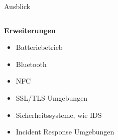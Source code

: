 {\begin{frame}{Ausblick}
\begin{columns}
   \begin{column}{0.5\textwidth}
        \textbf{Erweiterungen}
        \begin{itemize}
            \item Batteriebetrieb
            \item Bluetooth
            \item NFC
            \item SSL/TLS Umgebungen
            \item Sicherheitssysteme, wie IDS
            \item Incident Response Umgebungen
        \end{itemize}
   \end{column} 
   \end{columns}
\end{frame}
}